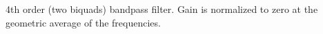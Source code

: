 4th order (two biquads) bandpass filter. Gain is normalized to zero at
the geometric average of the frequencies.




